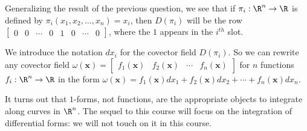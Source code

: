 \documentclass{ximera}
\begin{document}
	Generalizing the result of the previous question, we see that if $\pi_i:\R^n \to \R$ is defined by $\pi_i(x_1,x_2,\ldots,x_n) = x_i$, then $D(\pi_i)$ will
	be the row $\begin{bmatrix} 0&0& \cdots &0&1&0& \cdots &0\end{bmatrix}$, where the $1$ appears in the $i^{th}$ slot.
	
	We introduce the notation $dx_i$ for the covector field $D(\pi_i)$.  So we can rewrite any covector field 
	$\omega(\mathbf{x}) = \begin{bmatrix} f_1(\mathbf{x}) &  f_2(\mathbf{x}) & \cdots &  f_n(\mathbf{x})  \end{bmatrix}$ for $n$ functions $f_i:\R^n \to \R$
	in the form $\omega(\mathbf{x}) = f_1(\mathbf{x})dx_1+f_2(\mathbf{x})dx_2+ \cdots +f_n(\mathbf{x})dx_n$.
	
	It turns out that $1$-forms, not functions, are the appropriate objects to integrate along curves in $\R^n$. 
	The sequel to this course will focus on the integration of differential forms:  we will not touch on it in this course.
\end{document}
